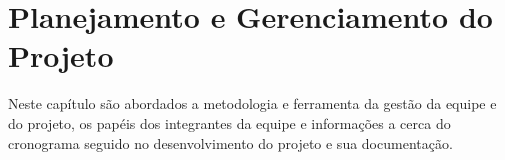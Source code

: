 \chapter{Planejamento e Gerenciamento do Projeto}
Neste capítulo são abordados a metodologia e ferramenta da gestão da equipe e do projeto, os papéis dos integrantes da equipe e informações a cerca do cronograma seguido no desenvolvimento do projeto e sua documentação.



